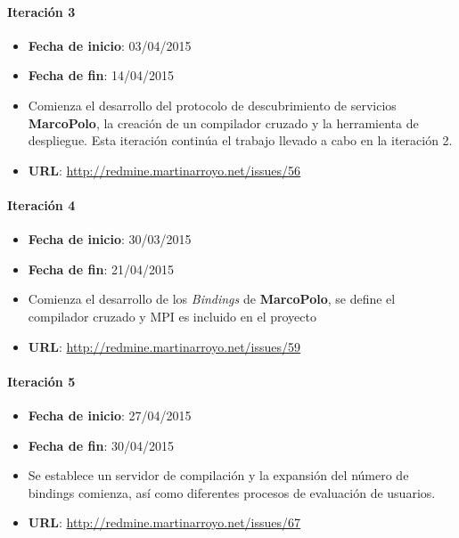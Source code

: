 \paragraph{Iteración 3\\}
\begin{itemize}
\item \textbf{Fecha de inicio}: 03/04/2015
\item \textbf{Fecha de fin}: 14/04/2015
\item Comienza el desarrollo del protocolo de descubrimiento de servicios \textbf{MarcoPolo}, la creación de un compilador cruzado y la herramienta de despliegue. Esta iteración continúa el trabajo llevado a cabo en la iteración 2.
\item \textbf{URL}: \href{http://redmine.martinarroyo.net/issues/56}{http://redmine.martinarroyo.net/issues/56}
\end{itemize}


\paragraph{Iteración 4\\}
\begin{itemize}
\item \textbf{Fecha de inicio}: 30/03/2015
\item \textbf{Fecha de fin}: 21/04/2015
\item Comienza el desarrollo de los \textit{Bindings} de \textbf{MarcoPolo}, se define el compilador cruzado y MPI es incluido en el proyecto
\item \textbf{URL}: \href{http://redmine.martinarroyo.net/issues/59}{http://redmine.martinarroyo.net/issues/59}
\end{itemize}


\paragraph{Iteración 5\\}
\begin{itemize}
\item \textbf{Fecha de inicio}: 27/04/2015
\item \textbf{Fecha de fin}: 30/04/2015
\item Se establece un servidor de compilación y la expansión del número de bindings comienza, así como diferentes procesos de evaluación de usuarios.
\item \textbf{URL}: \href{http://redmine.martinarroyo.net/issues/67}{http://redmine.martinarroyo.net/issues/67}
\end{itemize}


